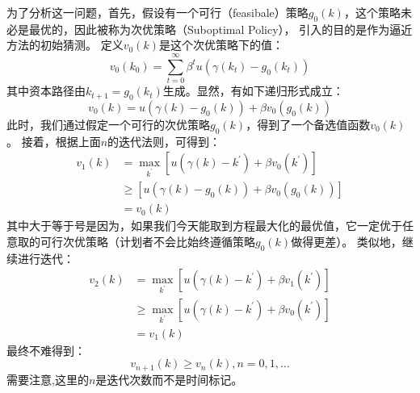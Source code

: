 为了分析这一问题，首先，假设有一个可行（feasibale）策略$g_0\left(k\right)$，这个策略未必是最优的，因此被称为次优策略（Suboptimal Policy），
引入的目的是作为逼近方法的初始猜测。
定义$v_0\left(k\right)$是这个次优策略下的值：
\begin{equation*}
    v_0\left(k_0\right) = \sum_{t=0}^{\infty} \beta^t u\left(\gamma\left(k_t\right)-g_0\left(k_t\right)\right)
\end{equation*}
其中资本路径由$k_{t+1}=g_0\left(k_t\right)$生成。显然，有如下递归形式成立：
\begin{equation*}
    v_0\left(k\right) = u\left(\gamma\left(k\right)-g_0\left(k\right)\right) + \beta v_0\left(g_0\left(k\right)\right)
\end{equation*}
此时，我们通过假定一个可行的次优策略$g_0\left(k\right)$，得到了一个备选值函数$v_0\left(k\right)$。
接着，根据上面$n$的迭代法则，可得到：
\begin{equation*}
    \begin{aligned}
        v_1\left(k\right) &= \max _{k^{\prime}}\left[u\left(\gamma\left(k\right)-k^{\prime}\right) 
            + \beta v_0\left(k^{\prime}\right)\right] \\
            &\geq \left[u\left(\gamma\left(k\right)-g_0\left(k\right)\right) + \beta v_0\left(g_0\left(k\right)\right)\right] \\
            &= v_0\left(k\right)   
    \end{aligned}
\end{equation*}
其中大于等于号是因为，如果我们今天能取到方程最大化的最优值，它一定优于任意取的可行次优策略（计划者不会比始终遵循策略$g_0(k)$做得更差）。
类似地，继续进行迭代：
\begin{equation*}
    \begin{aligned}
        v_2\left(k\right) &= \max _{k^{\prime}}\left[u\left(\gamma\left(k\right)-k^{\prime}\right) 
            + \beta v_1\left(k^{\prime}\right)\right] \\
            &\geq \max _{k^{\prime}}\left[u\left(\gamma\left(k\right)-k^{\prime}\right) + \beta v_0\left(k^{\prime}\right)\right] \\
            &= v_1\left(k\right)   
    \end{aligned}
\end{equation*}
最终不难得到：
\begin{equation*}
    v_{n+1}\left(k\right) \geq v_{n}\left(k\right), n=0,1,\dots
\end{equation*}
需要注意,这里的$n$是迭代次数而不是时间标记。

